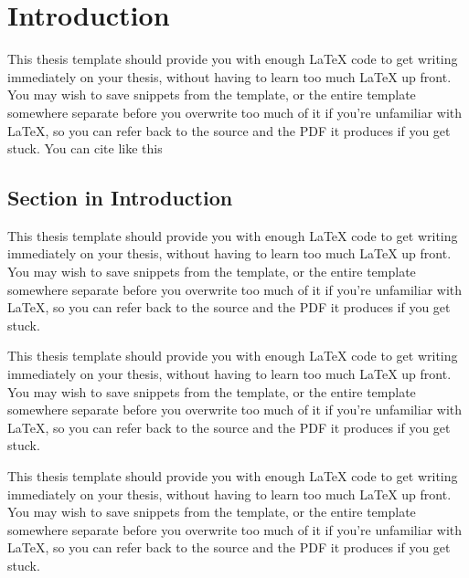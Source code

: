 \def\chapdir{./ChapterIntro}

\chapter{Introduction} \label{ch:intro}

This thesis template should provide you with enough \LaTeX{} code to get writing immediately on your thesis, without having to learn too much \LaTeX{} up front. You may wish to save snippets from the template, or the entire template somewhere separate before you overwrite too much of it if you're unfamiliar with \LaTeX{}, so you can refer back to the source and the PDF it produces if you get stuck. You can cite like this \cite{Douillard2009}

\section{Section in Introduction}
This thesis template should provide you with enough \LaTeX{} code to get writing immediately on your thesis, without having to learn too much \LaTeX{} up front. You may wish to save snippets from the template, or the entire template somewhere separate before you overwrite too much of it if you're unfamiliar with \LaTeX{}, so you can refer back to the source and the PDF it produces if you get stuck.

This thesis template should provide you with enough \LaTeX{} code to get writing immediately on your thesis, without having to learn too much \LaTeX{} up front. You may wish to save snippets from the template, or the entire template somewhere separate before you overwrite too much of it if you're unfamiliar with \LaTeX{}, so you can refer back to the source and the PDF it produces if you get stuck.

This thesis template should provide you with enough \LaTeX{} code to get writing immediately on your thesis, without having to learn too much \LaTeX{} up front. You may wish to save snippets from the template, or the entire template somewhere separate before you overwrite too much of it if you're unfamiliar with \LaTeX{}, so you can refer back to the source and the PDF it produces if you get stuck.


